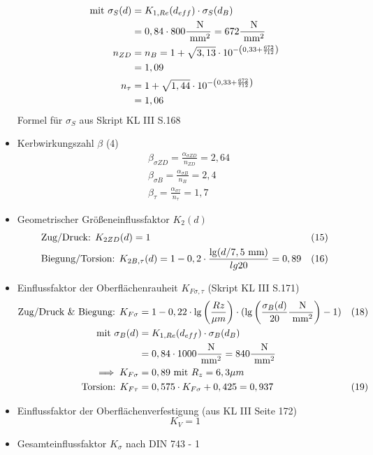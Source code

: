 \begin{itemize}
\begin{align*}
		\text{mit } \sigma_S (d) &= K_{1,Re} (d_{eff}) \cdot \sigma_S (d_B) \\
		&= 0,84 \cdot 800 \frac{\text{ N}}{\text{ mm}^2} = 672 \frac{\text{ N}}{\text{ mm}^2} \\
		n_{ZD} &= n_B = 1 + \sqrt{3,13} \cdot 10 ^{-\left( 0,33 + \frac{672}{712} \right)} \\
		&=1,09 \\
		n_{\tau} &= 1 + \sqrt{1,44} \cdot 10 ^{-\left( 0,33 + \frac{672}{712} \right)} \\
		&= 1,06 
	\end{align*}
	Formel für $\sigma_S$ aus Skript KL III  S.168
	\item Kerbwirkungszahl $\beta$ \hfill (4)
	\begin{align*}
		&\beta_{\sigma ZD} = \frac{\alpha_{\sigma ZD}}{n_{ZD}} = 2,64 \\
		&\beta_{\sigma B} = \frac{\alpha_{\sigma B}}{n_{B}} = 2,4 \\
		&\beta_{ \tau} = \frac{\alpha_{\sigma \tau}}{n_{\tau}} = 1,7 
	\end{align*}
	\item Geometrischer Größeneinflussfaktor $K_2 (d)$ 
	\begin{align*}
		&\text{Zug/Druck: }K_{2ZD} (d) = 1 & (15) \\
		&\text{Biegung/Torsion: } K_{2B,\tau} (d) = 1 -0,2 \cdot  \frac{\lg (d / 7,5 \text{ mm})}{lg 20}  = 0,89 &(16) 
	\end{align*}
	\item Einflussfaktor der Oberflächenrauheit $K_{F\sigma, \tau}$ (Skript KL III  S.171)
	\begin{align*}
		\text{Zug/Druck \& Biegung: } K_{F\sigma} &= 1 - 0,22 \cdot \lg \left( \frac{Rz}{\mu m}\right) \cdot ( \lg \left( \frac{\sigma_B (d)}{20}\frac{\text{ N}}{\text{ mm}^2}\right) -1 ) &(18) \\
		\text{mit } \sigma_B (d) &= K_{1,Re} (d_{eff}) \cdot \sigma_B (d_B) \\
		&= 0,84 \cdot 1000\frac{\text{ N}}{\text{ mm}^2} = 840 \frac{\text{ N}}{\text{ mm}^2} \\
		\implies K_{F\sigma} &= 0,89 \text{ mit } R_z = 6,3 \mu m\\
		\text{Torsion: } K_{F\tau} &= 0,575 \cdot K_{F\sigma} +0,425 = 0,937 & (19) 
	\end{align*}
	\item Einflussfaktor der Oberflächenverfestigung (aus KL III  Seite 172)
	\[
		K_{V} = 1
	\]
	\item Gesamteinflussfaktor $K_{\sigma}$ nach DIN 743 - 1

\end{itemize}
